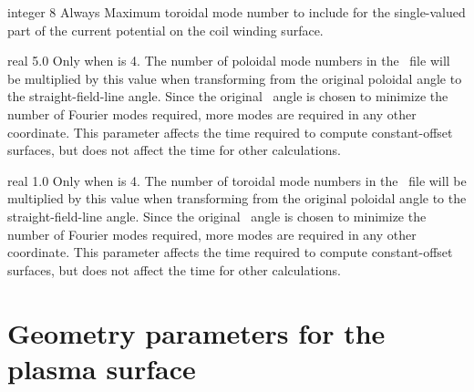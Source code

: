 \myhrule

{integer}
{8}
{Always}
{
Maximum toroidal mode number to include for the single-valued part of the current potential on the coil winding surface.
}

\myhrule

{real}
{5.0}
{Only when  is 4.}
{The number of poloidal mode numbers in the \vmec~file will be multiplied by this value
when transforming from the original poloidal angle to the straight-field-line angle.
Since the original \vmec~angle is chosen to minimize the number of Fourier modes required,
more modes are required in any other coordinate.
This parameter affects the time required to compute constant-offset surfaces,
but does not affect the time for other calculations.
}

\myhrule

{real}
{1.0}
{Only when  is 4.}
{The number of toroidal mode numbers in the \vmec~file will be multiplied by this value
when transforming from the original poloidal angle to the straight-field-line angle.
Since the original \vmec~angle is chosen to minimize the number of Fourier modes required,
more modes are required in any other coordinate.
This parameter affects the time required to compute constant-offset surfaces,
but does not affect the time for other calculations.
}

\section{Geometry parameters for the plasma surface}

